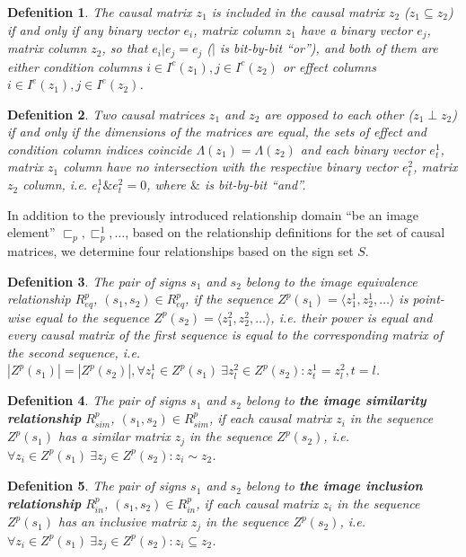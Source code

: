 \documentclass[12pt]{scrartcl}
\newtheorem{definition}{Defenition}
\begin{document}
	\begin{definition}
		The causal matrix $z_1$ is included in the causal matrix $z_2$ ($z_1\subseteq z_2$) if and only if any binary vector $e_i$, matrix column $z_1$ have a binary vector $e_j$, matrix column $z_2$, so that $e_i | e_j=e_j$ ($|$ is bit-by-bit ``or''), and both of them are either condition columns $i\in I^c(z_1), j\in I^c(z_2)$ or effect columns $i\in I^e(z_1), j\in I^e(z_2)$.
	\end{definition}
	
	\begin{definition}
		Two causal matrices  $z_1$ and $z_2$ are opposed to each other ($z_1\perp z_2$) if and only if the dimensions of the matrices are equal, the sets of effect and condition column indices coincide $\Lambda({z_1})=\Lambda({z_2})$ and each binary vector $e_t^1$, matrix $z_1$ column have no intersection with the respective binary vector $e_t^2$, matrix $z_2$ column, i.e. $e_t^1\& e_t^2=0$, where $\&$ is bit-by-bit ``and''.
	\end{definition}
	
	In addition to the previously introduced relationship domain ``be an image element'' ${\sqsubset_p, \sqsubset_p^1, \dots}$, based on the relationship definitions for the set of causal matrices, we determine four relationships based on the sign set $S$.
	
	\begin{definition}
		The pair of signs $s_1$ and $s_2$ belong to \textit{the image equivalence relationship} $R_{eq}^p$, $(s_1,s_2)\in R_{eq}^p$, if the sequence $Z^p(s_1)=\langle z_1^1,z_2^1,\dots\rangle$ is point-wise equal to the sequence $Z^p(s_2)=\langle z_1^2,z_2^2,\dots\rangle$, i.e. their power is equal and every causal matrix of the first sequence is equal to the corresponding matrix of the second sequence, i.e. $|Z^p(s_1)| = |Z^p(s_2)|, \forall z_t^1\in Z^p(s_1)\ \exists z_l^2\in Z^p(s_2): z_t^1=z_l^2, t=l$.
	\end{definition}
	
	\begin{definition}\label{def:sim}
		The pair of signs $s_1$ and $s_2$ belong to \textbf{the image similarity relationship} $R_{sim}^p$, $(s_1,s_2)\in R_{sim}^p$, if each causal matrix $z_i$ in the sequence $Z^p(s_1)$ has a similar matrix $z_j$ in the sequence $Z^p(s_2)$, i.e. $\forall z_i\in Z^p(s_1)\ \exists z_j\in Z^p(s_2): z_i\sim z_2$.
	\end{definition}
	
	\begin{definition}
		The pair of signs $s_1$ and $s_2$ belong to \textbf{the image inclusion relationship} $R_{in}^p$, $(s_1,s_2)\in R_{in}^p$, if each causal matrix $z_i$ in the sequence $Z^p(s_1)$ has an inclusive matrix $z_j$ in the sequence $Z^p(s_2)$, i.e. $\forall z_i\in Z^p(s_1)\ \exists z_j\in Z^p(s_2): z_i\subseteq z_2$.
	\end{definition}
\end{document}
